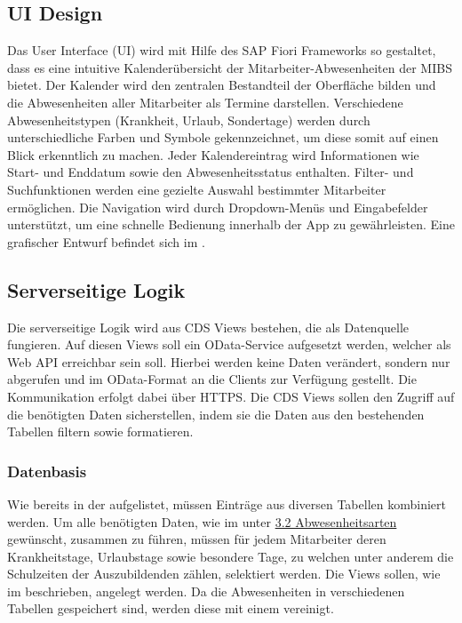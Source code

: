 \subsection{UI Design}
\label{sec:UI Design}
Das User Interface (UI) wird mit Hilfe des SAP Fiori Frameworks so gestaltet, dass es eine intuitive Kalenderübersicht der Mitarbeiter-Abwesenheiten der MIBS bietet. Der Kalender wird den zentralen Bestandteil der Oberfläche bilden und die Abwesenheiten aller Mitarbeiter als Termine darstellen. Verschiedene Abwesenheitstypen (\zB Krankheit, Urlaub, Sondertage) werden durch unterschiedliche Farben und Symbole gekennzeichnet, um diese somit auf einen Blick erkenntlich zu machen. Jeder Kalendereintrag wird Informationen wie Start- und Enddatum sowie den Abwesenheitsstatus enthalten.
Filter- und Suchfunktionen werden eine gezielte Auswahl bestimmter Mitarbeiter ermöglichen. Die Navigation wird durch Dropdown-Menüs und Eingabefelder unterstützt, um eine schnelle Bedienung innerhalb der App zu gewährleisten.
Eine grafischer Entwurf befindet sich im .

\subsection{Serverseitige Logik}
\label{sec:Serverseitige Logik}
Die serverseitige Logik wird aus CDS Views bestehen, die als Datenquelle fungieren. Auf diesen Views soll ein OData-Service aufgesetzt werden, welcher als Web API erreichbar sein soll. Hierbei werden keine Daten verändert, sondern nur abgerufen und im OData-Format an die Clients zur Verfügung gestellt. Die Kommunikation erfolgt dabei über HTTPS. Die CDS Views sollen den Zugriff auf die benötigten Daten sicherstellen, indem sie die Daten aus den bestehenden Tabellen filtern sowie formatieren.

\subsubsection{Datenbasis}
\label{sec:Datenbasis}

Wie bereits in der  aufgelistet, müssen Einträge aus diversen Tabellen kombiniert werden. Um alle benötigten Daten, wie im  unter \hyperref[Abwesenheitsarten]{3.2 Abwesenheitsarten} gewünscht, zusammen zu führen, müssen für jedem Mitarbeiter deren Krankheitstage, Urlaubstage sowie besondere Tage, zu welchen unter anderem die Schulzeiten der Auszubildenden zählen, selektiert werden. Die Views sollen, wie im  beschrieben, angelegt werden.
Da die Abwesenheiten in verschiedenen Tabellen gespeichert sind, werden diese mit einem  vereinigt.

